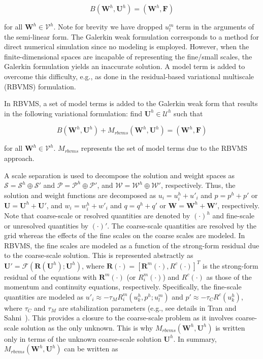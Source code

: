 \begin{equation}
\label{eq:NS_Gal_weak}
B(\bm{W}^h,\bm{U}^h) = (\bm{W}^h,\bm{F})
\end{equation}

\noindent for all $\bm{W}^h \in \bm{\mathcal{V}}^h$.
Note for brevity we have dropped $u^m_l$ term in the arguments of the semi-linear form.
The Galerkin weak formulation corresponds to a method for
direct numerical simulation since no modeling is employed.
However, when the finite-dimensional spaces are incapable of representing the
fine/small scales, the Galerkin formulation yields an
inaccurate solution.
A model term is added to overcome this difficulty, e.g.,
as done in the residual-based variational multiscale (RBVMS) formulation.

In RBVMS, a set of model terms is added to the Galerkin weak form that results in
the following variational formulation:
find $\bm{U}^h \in \bm{\mathcal{U}}^h$ such that

\begin{equation}
\label{eq:NS_rbvms}
 B(\bm{W}^h,\bm{U}^h) + M_{rbvms}(\bm{W}^h,\bm{U}^h ) = (\bm{W}^h,\bm{F})
\end{equation}

\noindent for all $\bm{W}^h \in \bm{\mathcal{V}}^h$.
$M_{rbvms}$ represents the set of model terms
due to the RBVMS approach.

A scale separation is used to decompose
the solution and weight spaces as
$\bm{\mathcal{S}}=\bm{\mathcal{S}}^h \oplus \bm{\mathcal{S}}'$ and $\mathcal{P} = \mathcal{P}^h \oplus \mathcal{P}'$,
and $\bm{\mathcal{W}}=\bm{\mathcal{W}}^h\oplus \bm{\mathcal{W}}'$,
respectively. Thus, the solution and weight functions
are decomposed as $u_i = u^h_i + u'_i$ and $p = p^h + p'$ or $\bm{U}=\bm{U}^h+\bm{U}'$, and
$w_i = w^h_i + w'_i$ and $q = q^h + q'$ or $\bm{W}=\bm{W}^h+\bm{W}'$, respectively.
Note that coarse-scale or resolved quantities are
denoted by $(\cdot)^h$ and fine-scale or unresolved quantities 
by $(\cdot)'$.
The coarse-scale quantities are resolved by
the grid whereas the effects of the fine scales on the coarse scales
are modeled.
In RBVMS, the fine scales are modeled as a function of the strong-form residual
due to the coarse-scale solution. This is represented abstractly as
$\bm{U}' = \mathcal{F}(\bm{R}(\bm{U}^h);\bm{U}^h)$, where
$\bm{R}(\cdot) = [\bm{R}^m(\cdot),R^c(\cdot)]^T$ 
is the strong-form residual of the equations with
$\bm{R}^m(\cdot)$ (or $R^m_i(\cdot)$) and $R^c(\cdot)$ as those
of the momentum and continuity equations, respectively.
Specifically, the fine-scale quantities are modeled as 
$u'_i \approx -\tau_M R^m_i(u_k^h,p^h;u^m_l)$
and $p' \approx -\tau_C R^c(u^h_k)$, where
$\tau_C$ and $\tau_M$ are stabilization parameters
(e.g., see details in Tran and Sahni~\cite{bib:tran2017b}).
This provides a closure to the coarse-scale problem as it involves coarse-scale solution as the only unknown. 
This is why $M_{rbvms}(\bm{W}^h,\bm{U}^h )$ is written only in terms of the unknown coarse-scale solution $\bm{U}^h$.
In summary, $M_{rbvms}(\bm{W}^h,\bm{U}^h)$ can be written as

